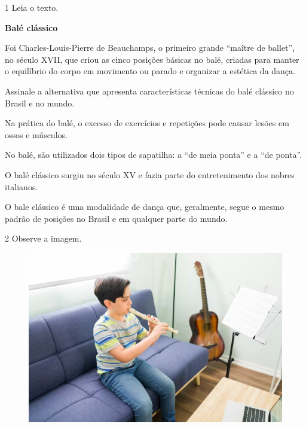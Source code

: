 \num{1} Leia o texto.

\begin{myquote}
\textbf{Balé clássico}

Foi Charles-Louis-Pierre de Beauchamps, o primeiro grande ``maître de ballet'', no século XVII, que criou as cinco posições básicas no balé, criadas para manter o equilíbrio do corpo em movimento ou parado e organizar a estética da dança.

\end{myquote}

Assinale a alternativa que apresenta características técnicas do balé
clássico no Brasil e no mundo.

\begin{escolha}
\item
  Na prática do balé, o excesso de exercícios e repetições pode causar
  lesões em ossos e músculos.
\item
  No balé, são utilizados dois tipos de sapatilha: a “de meia ponta” e
  a “de ponta”.
\item
  O balé clássico surgiu no século XV e fazia parte do entretenimento
  dos nobres italianos.
\item
  O bale clássico é uma modalidade de dança que, geralmente, segue o
  mesmo padrão de posições no Brasil e em qualquer parte do mundo.
\end{escolha}



\pagebreak
\num{2} Observe a imagem.

\begin{figure}[htpb!]
\includegraphics[width=\textwidth]{./imgs/art41.png}
\end{figure}

